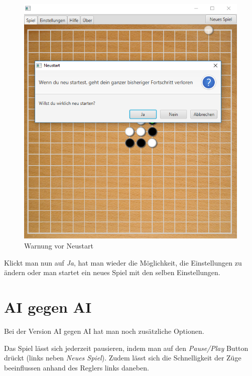 \documentclass[11pt]{article}
\newcommand{\1}{{\mathds{1}}}
\newcommand{\imagewidth}{.8\linewidth}
\begin{document}
	\begin{figure}[H]
		\centering
		\includegraphics[width=\imagewidth]{warnung.png}
		\caption{Warnung vor Neustart}
		\label{warnung}
	\end{figure}
	
	Klickt man nun auf \textit{Ja}, hat man wieder die Möglichkeit, die Einstellungen zu ändern oder man startet ein neues Spiel mit den selben Einstellungen. 
	
	\section{AI gegen AI}
	
	Bei der Version AI gegen AI hat man noch zusätzliche Optionen. 
	
	Das Spiel lässt sich jederzeit pausieren, indem man auf den \textit{Pause/Play} Button drückt (links neben \textit{Neues Spiel}).
	Zudem lässt sich die Schnelligkeit der Züge beeinflussen anhand des Reglers links daneben. 
	
\end{document}
